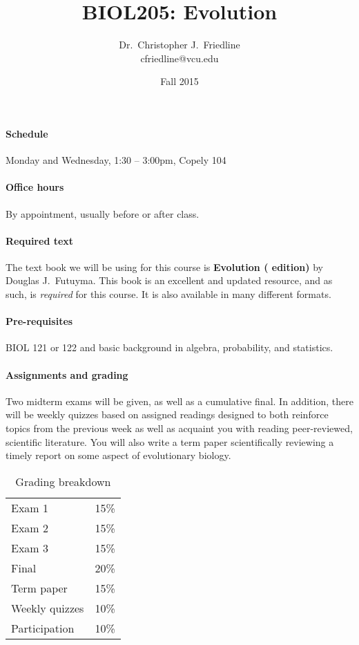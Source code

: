 \documentclass{article}
\title{BIOL205: Evolution}
\author{Dr.\ Christopher J.\ Friedline \\ cfriedline@vcu.edu}
\date{Fall 2015}
\begin{document}
\maketitle
\linespread{1.3}

\paragraph{Schedule}
Monday and Wednesday, 1:30 -- 3:00pm, Copely 104

\paragraph{Office hours}
By appointment, usually before or after class.

\paragraph{Required text}
The text book we will be using for this course is \textbf{Evolution (
edition)} by Douglas J.\ Futuyma. This book is an excellent and updated
resource,
and as such, is \textit{required} for this course. It is also available in many
different formats.

\paragraph{Pre-requisites}
BIOL 121 or 122 and basic background in algebra, probability, and statistics.

\paragraph{Assignments and grading}
Two midterm exams will be given, as well
as a cumulative final.  In addition, there will be weekly quizzes based on
assigned readings designed to both reinforce topics from the previous week as
well as acquaint you with reading peer-reviewed, scientific literature.  You
will also write a term paper scientifically reviewing a timely report on some
aspect of evolutionary biology.

\begin{table}[h]
\centering
\caption*{Grading breakdown}

\begin{tabular}{l|r}
Exam 1          &   15\% \\
Exam 2          &   15\% \\
Exam 3			& 	15\% \\
Final           &   20\% \\ 
Term paper      &   15\% \\
Weekly quizzes  &	10\% \\
Participation   &   10\% \\

\end{tabular}

\end{table}
\end{document}

